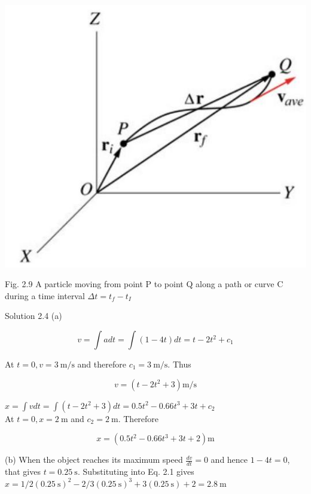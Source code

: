 \documentclass[10pt]{article}
\begin{document}
\begin{center}
\includegraphics[max width=\textwidth]{2024_09_13_db1f357d2aad0a03eb2eg-030}
\end{center}

Fig. 2.9 A particle moving from point P to point Q along a path or curve C during a time interval $\Delta t=t_{f}-t_{I}$

Solution 2.4 (a)

$$
v=\int a d t=\int(1-4 t) d t=t-2 t^{2}+c_{1}
$$

At $t=0, v=3 \mathrm{~m} / \mathrm{s}$ and therefore $c_{1}=3 \mathrm{~m} / \mathrm{s}$. Thus

$$
v=\left(t-2 t^{2}+3\right) \mathrm{m} / \mathrm{s}
$$

$x=\int v d t=\int\left(t-2 t^{2}+3\right) d t=0.5 t^{2}-0.66 t^{3}+3 t+c_{2}$\\
At $t=0, x=2 \mathrm{~m}$ and $c_{2}=2 \mathrm{~m}$. Therefore


\begin{equation*}
x=\left(0.5 t^{2}-0.66 t^{3}+3 t+2\right) \mathrm{m} \tag{2.1}
\end{equation*}


(b) When the object reaches its maximum speed $\frac{d v}{d t}=0$ and hence $1-4 t=0$, that gives $t=0.25 \mathrm{~s}$. Substituting into Eq. 2.1 gives\\
$x=1 / 2(0.25 \mathrm{~s})^{2}-2 / 3(0.25 \mathrm{~s})^{3}+3(0.25 \mathrm{~s})+2=2.8 \mathrm{~m}$
\end{document}
